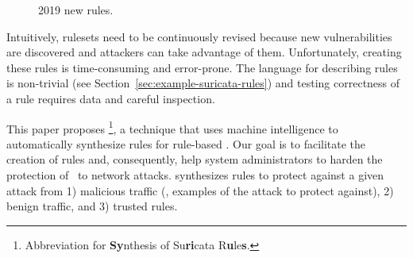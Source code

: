 \documentclass[sigconf,review, anonymous]{acmart}
\begin{document}
\begin{figure}
    \vspace{-2ex}  
    \centering
    \vspace{-3ex}
    \caption{\label{fig:distribution-rules-per-month}2019 new rules.}
\end{figure}%

Intuitively, rulesets need to be continuously revised because new
vulnerabilities are discovered and attackers can take advantage of
them. Unfortunately, creating these rules is time-consuming and
error-prone. The language for describing rules is non-trivial (see
Section~\ref{sec:example-suricata-rules}) and testing correctness of a
rule requires data and careful inspection.



This paper proposes \tname{}\footnote{Abbreviation for
  \textbf{Sy}nthesis of Su\textbf{ri}cata R\textbf{u}le\textbf{s}.}, a
technique that uses machine intelligence to automatically synthesize
rules for rule-based \nids. Our goal is to facilitate the creation of
rules and, consequently, help system administrators to harden the
protection of \nids\ to network attacks. \tname{} synthesizes rules to
protect against a given attack from 1) malicious traffic (\ie{},
examples of the attack to protect against), 2) benign traffic, and 3)
trusted rules.
\end{document}
